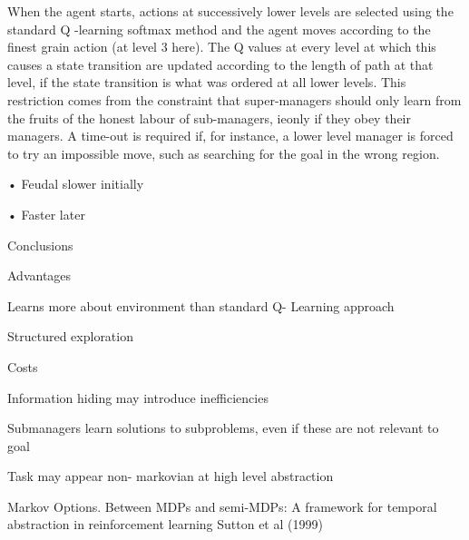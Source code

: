 \documentclass[english]{article}
\begin{document}
When the agent starts, actions at successively lower levels are selected using the
standard Q -learning softmax method and the agent moves according to the finest
grain action (at level 3 here). The Q values at every level at which this causes
a state transition are updated according to the length of path at that level, if the
state transition is what was ordered at all lower levels. This restriction comes from
the constraint that super-managers should only learn from the fruits of the honest
labour of sub-managers, ieonly if they obey their managers. A time-out is required
if, for instance, a lower level manager is forced to try an impossible move, such as
searching for the goal in the wrong region.

•  Feudal slower initially

• Faster later

\item  
Conclusions

Advantages

\benum

\item  Learns more about
environment than standard Q-
Learning approach
\item  Structured exploration

\eenum

Costs

\benum

\item   Information hiding may
introduce inefficiencies
\item   Submanagers learn solutions
to subproblems, even if these
are not relevant to goal
\item   Task may appear non-
markovian at high level
abstraction
\eenum


\eenum

\item Markov Options. Between MDPs and semi-MDPs: A framework for temporal
abstraction in reinforcement learning Sutton et al (1999)
\end{document}
